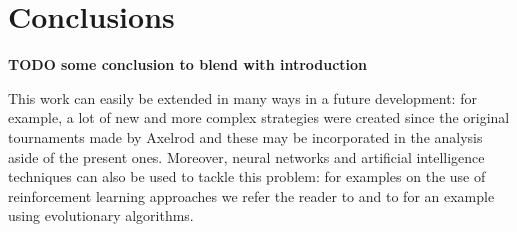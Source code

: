 \documentclass[journal,a4paper,10pt,twoside]{IEEEtran} %
\begin{document}
\section{Conclusions} \label{s:conc}
\textbf{TODO some conclusion to blend with introduction}

This work can easily be extended in many ways in a future development: for example, a lot of new and more complex strategies were created since the original tournaments made by Axelrod and these may be incorporated in the analysis aside of the present ones.
Moreover, neural networks and artificial intelligence techniques can also be used to tackle this problem: for examples on the use of reinforcement learning approaches we refer the reader to \cite{plosRLdominant,coopSeqRL,kedaoRL} and to \cite{shashiEvoAlg} for an example using evolutionary algorithms.

\balance


\end{document}
